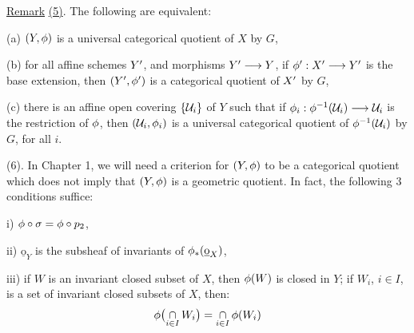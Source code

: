 \uline{Remark} \uline{(5)}. The following are equivalent:

(a) $(Y,\phi)$ is a universal categorical quotient of $X$ by $G$,

(b) for all affine schemes $Y'$, and morphisms $Y'\longrightarrow Y$, if $\phi':X'\longrightarrow Y'$ is the base extension, then $(Y',\phi')$ is a categorical quotient of $X'$ by $G$,

(c) there is an affine open covering $\{\mathcal U_i\}$ of $Y$ such that if $\phi_i:\phi^{-1}(\mathcal U_i)\longrightarrow\mathcal U_i$ is the restriction of $\phi$, then $(\mathcal U_i,\phi_i)$ is a universal categorical quotient of $\phi^{-1}(\mathcal U_i)$ by $G$, for all $i$.

(6). In Chapter 1, we will need a criterion for $(Y,\phi)$ to be a categorical quotient which does not imply that $(Y,\phi)$ is a geometric quotient. In fact, the following 3 conditions suffice:

i) $\phi\circ\sigma=\phi\circ p_2$,

ii) $\underline{\mathrm{o}}_Y$ is the subsheaf of invariants of $\phi_*(\underline{\mathrm{o}}_X)$,

iii) if $W$ is an invariant closed subset of $X$, then $\phi(W)$ is closed in $Y$; if $W_i$, $i\in I$, is a set of invariant closed subsets of $X$, then:
\[
\phi\bigl(\underset{i\in I}{\cap}\,W_i\bigr)=\underset{i\in I}{\cap}\,\phi(W_i)
\]

